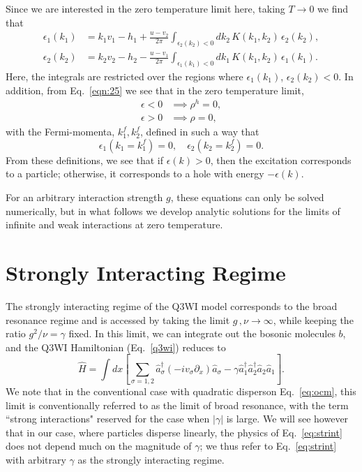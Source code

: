\documentclass[aps,pra,
superscriptaddress,
reprint,twocolumn,preprintnumbers,
amsmath,amssymb,
nofootinbib]{revtex4-1}
\begin{document}
Since we are interested in the zero temperature limit here, taking $T\to0$ we find that
		\begin{align}
		\label{eqn:26}
		\epsilon_1(k_1) & =  k_1 v_1 - h_1 + \frac{u - v_2}{2\pi} \int_{\epsilon_2(k_2)<0} dk_2 \,K(k_1, k_2) \, \epsilon_2( k_2), \nonumber \\
		\epsilon_2(k_2) & =  k_2 v_2 - h_2 - \frac{u - v_1}{2\pi} \int_{\epsilon_1(k_1)<0} d k_1\,K(k_1,k_2) \,  \epsilon_1(k_1).
		\end{align}
Here, the integrals are restricted over the regions where $\epsilon_1(k_1)$, $\epsilon_2(k_2) <0$. In addition, from Eq.~\eqref{eqn:25} we see that in the zero temperature limit, 
		\begin{align}
		\epsilon < 0 &\implies \rho^h = 0 ,\nonumber \\
		\epsilon > 0 &\implies \rho = 0 ,
		\end{align}
with the Fermi-momenta, $k_1^f, k_2^f$, defined in such a way that
		\begin{equation}
		\epsilon_1(k_1 = k_1^f) = 0 ,\quad \epsilon_2(k_2 = k_2^f) = 0.
		\end{equation}
From these definitions, we see that if $\epsilon(k) > 0$, then the excitation corresponds to a particle; otherwise, it corresponds to a hole with energy $-\epsilon(k)$. 

For an arbitrary interaction strength $g$, these equations can only be solved numerically, but in what follows we develop analytic solutions for the limits of infinite and weak interactions at zero temperature. 

		
		\section{Strongly Interacting Regime}
		\label{strongint}
		The strongly interacting regime of the Q3WI model corresponds to the broad resonance regime and is accessed by taking the limit $g\, ,\nu\to\infty$, while keeping the ratio $g^2/\nu = \gamma$ fixed. 
In this limit, we can integrate out the bosonic molecules $b$, and the Q3WI Hamiltonian (Eq.~\eqref{q3wi}) reduces to
		\begin{equation} 
		\label{eq:strint} 
	\hat{H} = \int dx  \left[ \sum\limits_{\sigma=1,2}  \hat{a}_\sigma^\dagger \left(-i v_\sigma \partial_x \right) \hat{a}_\sigma -\gamma \hat{a}_1^{\dagger}\hat{a}_2^{\dagger}\hat{a}_2\hat{a}_1 \right].
		\end{equation}
We note that in the conventional case with quadratic disperson Eq.~\eqref{eq:ocm}, this limit is conventionally referred to as the limit of broad resonance, with the term ``strong interactions" reserved for the case when 	
$\left| \gamma \right|$ is large. We will see however that in our case, where particles disperse linearly, the physics of Eq.~\eqref{eq:strint} does not depend much on the magnitude of $\gamma$; we thus refer to Eq.~\eqref{eq:strint}  with arbitrary $\gamma$ as the strongly interacting regime.
		
\end{document}
